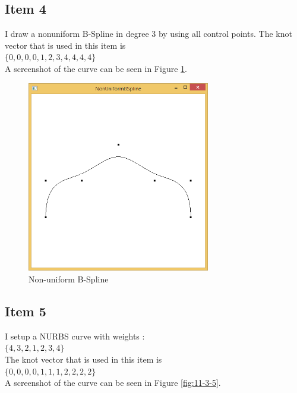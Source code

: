 \subsection{Item 4}

I draw a nonuniform B-Spline in degree 3 by using all control points. The knot vector that is used in this item is\\

$ \{0, 0, 0, 0, 1, 2, 3, 4, 4, 4, 4\} $ \\

\noindent
A screenshot of the curve can be seen in Figure \ref{fig:11-3-4}.


\begin{figure}[hp]
\centering
\includegraphics[width=8cm]{../Screenshots/ex-11/3-4.png}
\caption{Non-uniform B-Spline}
\label{fig:11-3-4}
\end{figure}

\subsection{Item 5}

I setup a NURBS curve with weights :\\

$ \{4, 3, 2, 1, 2, 3, 4\} $ \\

\noindent
The knot vector that is used in this item is\\


$ \{0, 0, 0, 0, 1, 1, 1, 2, 2, 2, 2\} $ \\

\noindent
A screenshot of the curve can be seen in Figure \ref{fig:11-3-5}.


